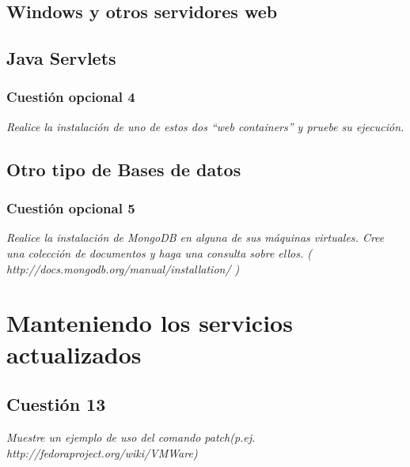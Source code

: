 \subsection{Windows y otros servidores web}





\subsection{Java Servlets}
\subsubsection{Cuestión opcional 4}
\textit{Realice la instalación de uno de estos dos “web containers” y pruebe su ejecución.}







\subsection{Otro tipo de Bases de datos}
\subsubsection{Cuestión opcional 5}
\textit{Realice la instalación de MongoDB en alguna de sus máquinas virtuales. Cree una colección de documentos y haga una consulta sobre ellos. ( http://docs.mongodb.org/manual/installation/ )}







\section{Manteniendo los servicios actualizados}
\subsection{Cuestión 13}
\textit{Muestre un ejemplo de uso del comando patch(p.ej. http://fedoraproject.org/wiki/VMWare)}
\newline

